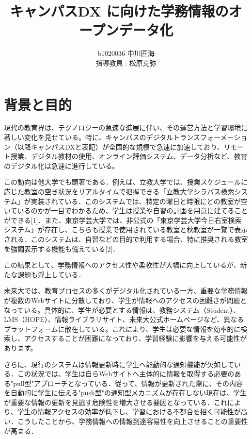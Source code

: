 \documentclass[11pt]{ujarticle}
\author{%
b1020036 中川匠海\\指導教員 : 松原克弥
}
\title{キャンパスDX に向けた学務情報のオープンデータ化}
\begin{document}
\maketitle

\section{背景と目的}

現代の教育界は、テクノロジーの急速な進展に伴い、その運営方法と学習環境に著しい変化を見せている。特に、キャンパスのデジタルトランスフォーメーション（以降キャンパスDXと表記）が全国的な規模で急速に加速しており、リモート授業、デジタル教材の使用、オンライン評価システム、データ分析など、教育のデジタル化は急速に進行している。

この動向は他大学でも顕著である．例えば、立教大学では、授業スケジュールに応じた教室の空き状況をリアルタイムで把握できる「立教大学シラバス検索システム」が実装されている．このシステムでは、特定の曜日と時限にどの教室が空いているのかが一目でわかるため、学生は授業や自習の計画を用意に建てることができる[1]．また、東京学芸大学では、非公式の「東京学芸大学今日右室検索システム」が存在し、こちらも授業で使用されている教室と秋教室が一覧で表示される．このシステムは、自習などの目的で利用する場合、特に推奨される教室を強調表示する機能も備えている[2]．

この結果として、学務情報へのアクセス性や柔軟性が大幅に向上しているが、新たな課題も浮上している．

未来大では、教育プロセスの多くがデジタル化されている一方、重要な学務情報が複数のWebサイトに分散しており、学生が情報へのアクセスの困難さが問題となっている。具体的に、学生が必要とする情報は、教務システム（Student）、LMS（HOPE）、情報ライブラリサイト、未来大公式ホームページなど、異なるプラットフォームに散在している。これにより、学生は必要な情報を効率的に検索し、アクセスすることが困難になっており、学習経験に影響を与える可能性があります。

さらに、現行のシステムは情報更新時に学生へ能動的な通知機能が欠如している．この状況では、学生は自らWebサイトへ主体的に情報を取得する必要のある"pull型"アプローチとなっている．従って、情報が更新された際に、その内容を自動的に学生に伝える"push型"の通知型メカニズムが存在しない現在は、学生が重要な情報の更新を見逃す危険性を増大させる要因となっている．これにより、学生の情報アクセスの効率が低下し、学習における不都合を招く可能性が高い．こうしたことから、学務情報への情報到達容易性を向上させることの重要性が高まる．

\end{document}
